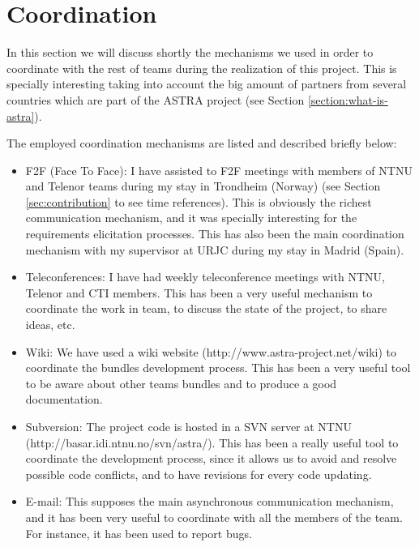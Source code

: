 
\section{Coordination}
\label{sec:coordination}
In this section we will discuss shortly the mechanisms we used in order to
coordinate with the rest of teams during the realization of this project.
This is specially interesting taking into account the big amount of partners
from several countries which are part of the ASTRA project (see Section
\ref{section:what-is-astra}).

The employed coordination mechanisms are listed and described briefly below:
\begin{itemize}
  \item F2F (Face To Face): I have assisted to F2F meetings with members of
  NTNU and Telenor teams during my stay in Trondheim (Norway) (see Section
  \ref{sec:contribution} to see time references). This is obviously the richest
  communication mechanism, and it was specially interesting for the requirements
  elicitation processes. This has also been the main coordination mechanism with
  my supervisor at URJC during my stay in Madrid (Spain).
  \item Teleconferences: I have had weekly teleconference meetings with NTNU,
  Telenor and CTI members. This has been a very useful mechanism to coordinate 
  the work in team, to discuss the state of the project, to share ideas, etc.
  \item Wiki: We have used a wiki website (http://www.astra-project.net/wiki)
  to coordinate the bundles development process. This has been a very useful
  tool to be aware about other teams bundles and to produce a good
  documentation.
  \item Subversion: The project code is hosted in a SVN server at NTNU \\ 
  (http://basar.idi.ntnu.no/svn/astra/). This has been a really useful tool to
  coordinate the development process, since it allows us to avoid and resolve 
  possible code conflicts, and to have revisions for every code updating.
  \item E-mail: This supposes the main asynchronous communication mechanism,
  and it has been very useful to coordinate with all the members of the team.
  For instance, it has been used to report bugs.
\end{itemize}

